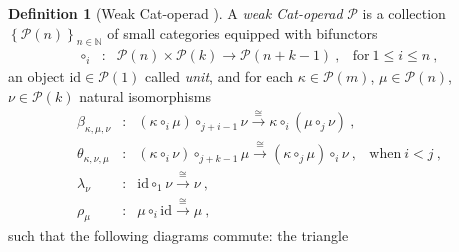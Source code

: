 \documentclass[10pt]{amsart}
\theoremstyle{definition}
\newtheorem{definition}[thm]{Definition}
\theoremstyle{remark}
\numberwithin{equation}{section}
\newcommand{\0}{\color{blue}{\mathsf{0}}}
\begin{document}
\begin{definition}[Weak Cat-operad {\cite[Section 12]{DP15}}] A \emph{weak Cat-operad} $\mathcal{P}$ is a collection $\left\{  \mathcal{P}(n)  \right\}_{n\in \mathbb{N}}$ of small categories equipped with bifunctors  
$$ \begin{array}{clll}
\circ_i&\colon& \mathcal{P}(n) \times
                  \mathcal{P}(k)
                  \longrightarrow \mathcal{P}(n+k-1) \ ,
                  & \text{for}\ 1 \leq i \leq n \ ,
\end{array}  $$
an object $\mathrm{id} \in \mathcal{P}(1)$ called \emph{unit}, and for each $\kappa \in \mathcal{P}(m)$,  $\mu \in \mathcal{P}(n)$, $\nu \in \mathcal{P}(k)$ natural isomorphisms 
$$ \begin{array}{clll}
    \beta_{\kappa,\mu,\nu}&\colon& 
    (\kappa \circ_i \mu) \circ_{j+i-1} \nu  \overset{\cong}{\longrightarrow} \kappa \circ_i (\mu \circ_j \nu) \ , &  \\
    \theta_{\kappa,\nu,\mu}&\colon& 
    (\kappa \circ_i \nu) \circ_{j+k-1} \mu 
    \overset{\cong}{\longrightarrow} (\kappa \circ_j \mu) \circ_i \nu \ , & \text{when}\ i < j \ , \\
    \lambda_\nu &\colon& 
    \mathrm{id} \circ_1 \nu \overset{\cong}{\longrightarrow} \nu \ , & \\
    \rho_\mu &\colon& 
    \mu \circ_i \mathrm{id} \overset{\cong}{\longrightarrow} \mu \ , & 
\end{array}  $$
such that the following diagrams commute: the triangle \\
\begin{center}
 \quad \quad 
{}
\end{center}
\end{definition}
\end{document}
